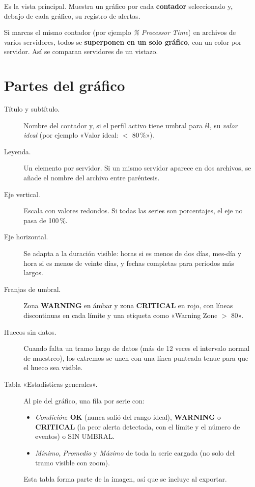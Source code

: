 \documentclass[11pt,a4paper,oneside]{report}
\newcommand{\campo}[1]{\textsf{\textit{#1}}}
\newcommand{\warnz}{\textsf{\textbf{\color{warnc}WARNING}}}
\newcommand{\critz}{\textsf{\textbf{\color{critc}CRITICAL}}}
\newcommand{\okz}{\textsf{\textbf{\color{okc}OK}}}
\begin{document}
Es la vista principal. Muestra un gráfico por cada \textbf{contador}
seleccionado y, debajo de cada gráfico, su registro de alertas.

\begin{consejo}
Si marcas el mismo contador (por ejemplo \emph{\% Processor Time}) en
archivos de varios servidores, todos se \textbf{superponen en un solo
gráfico}, con un color por servidor. Así se comparan servidores de un
vistazo.
\end{consejo}

\section{Partes del gráfico}

\begin{description}
  \item[Título y subtítulo.] Nombre del contador y, si el perfil activo tiene
    umbral para él, su \emph{valor ideal} (por ejemplo «Valor ideal: $<$ 80\,\%»).
  \item[Leyenda.] Un elemento por servidor. Si un mismo servidor aparece en
    dos archivos, se añade el nombre del archivo entre paréntesis.
  \item[Eje vertical.] Escala con valores redondos. Si todas las series son
    porcentajes, el eje no pasa de 100\,\%.
  \item[Eje horizontal.] Se adapta a la duración visible: horas si es menos de
    dos días, mes-día y hora si es menos de veinte días, y fechas completas
    para periodos más largos.
  \item[Franjas de umbral.] Zona \warnz{} en ámbar y zona \critz{} en rojo, con
    líneas discontinuas en cada límite y una etiqueta como
    «Warning Zone $>$ 80».
  \item[Huecos sin datos.] Cuando falta un tramo largo de datos (más de 12
    veces el intervalo normal de muestreo), los extremos se unen con una línea
    punteada tenue para que el hueco sea visible.
  \item[Tabla «Estadísticas generales».] Al pie del gráfico, una fila por
    serie con:
    \begin{itemize}
      \item \campo{Condición}: \okz{} (nunca salió del rango ideal), \warnz{} o
            \critz{} (la peor alerta detectada, con el límite y el número de
            eventos) o \textsf{SIN UMBRAL}.
      \item \campo{Mínimo}, \campo{Promedio} y \campo{Máximo} de toda la serie
            cargada (no solo del tramo visible con zoom).
    \end{itemize}
    Esta tabla forma parte de la imagen, así que se incluye al exportar.
\end{description}
\end{document}
